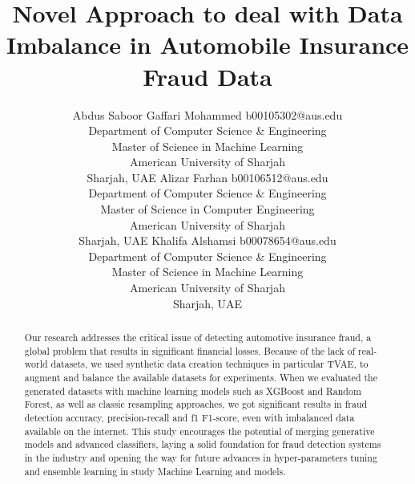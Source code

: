 \documentclass[twoside,11pt]{article}
\begin{document}
\title{Novel Approach to deal with Data Imbalance in Automobile Insurance Fraud Data}

\author{\name Abdus Saboor Gaffari Mohammed \email b00105302@aus.edu \\
        \addr Department of Computer Science \& Engineering\\
        Master of Science in Machine Learning\\
        American University of Sharjah\\
        Sharjah, UAE
        \AND
        \name Alizar Farhan \email b00106512@aus.edu \\
        \addr Department of Computer Science \& Engineering\\
        Master of Science in Computer Engineering\\
        American University of Sharjah\\
        Sharjah, UAE
        \AND
        \name Khalifa Alshamsi \email b00078654@aus.edu \\
        \addr Department of Computer Science \& Engineering\\
        Master of Science in Machine Learning\\
        American University of Sharjah\\
        Sharjah, UAE
       } 

\maketitle

\begin{abstract}%

Our research addresses the critical issue of detecting automotive insurance fraud, a global problem that results in significant financial losses. Because of the lack of real-world datasets, we used synthetic data creation techniques in particular TVAE, to augment and balance the available datasets for experiments. When we evaluated the generated datasets with machine learning models such as XGBoost and Random Forest, as well as classic resampling approaches, we got significant results in fraud detection accuracy, precision-recall and f1 F1-score, even with imbalanced data available on the internet. This study encourages  the potential of merging generative models and advanced classifiers, laying a solid foundation for fraud detection systems in the industry and opening the way for future advances in hyper-parameters tuning and ensemble learning in study Machine Learning and models.

\end{abstract}
\end{document}
